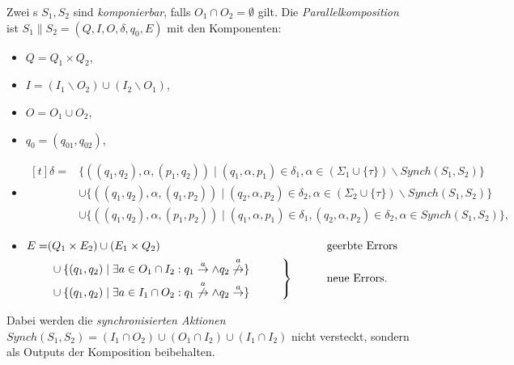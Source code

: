 \begin{Def}[Parallelkomposition]
  Zwei \EIO{}s $S_1, S_2$ sind \emph{komponierbar}, falls
  $O_1\cap O_2=\emptyset$ gilt. Die \emph{Parallelkomposition} ist
  $S_1\|S_2=(Q,I,O,\delta ,q_0,E)$ mit den Komponenten:
  \begin{itemize}
    \item $Q=Q_1\times Q_2$,
    \item $I=(I_1\backslash O_2)\cup(I_2\backslash O_1)$,
    \item $O=O_1\cup O_2$,
    \item $q_0=(q_{01},q_{02})$,
    \item $\begin{aligned}[t]
    \delta =&\{((q_1,q_2),\alpha ,(p_1,q_2))\mid (q_1,\alpha ,p_1)\in\delta
      _1,\alpha\in(\Sigma _1\cup\{\tau\})\backslash Synch(S_1,S_2)\}\\
      &\cup\{((q_1,q_2),\alpha ,(q_1,p_2))\mid (q_2,\alpha ,p_2)\in\delta
      _2,\alpha\in(\Sigma _2\cup\{\tau\})\backslash Synch(S_1,S_2)\}\\
      &\cup\{((q_1,q_2),\alpha ,(p_1,p_2))\mid (q_1,\alpha ,p_1)\in\delta
      _1, (q_2,\alpha ,p_2)\in\delta _2, \alpha\in Synch(S_1,S_2)\},
  \end{aligned}$
    \item $\begin{aligned}[t]
        E=&(Q_1\times E_2)\cup (E_1\times Q_2)
        &&\phantom{neue}\mathrm{geerbte}~\mathrm{Errors}\\
        &\left.\begin{aligned}
        &\cup\{(q_1,q_2)\mid \exists a\in O_1\cap I_2: q_1\overset{a}{\rightarrow}\wedge
      q_2\overset{a}{\not{\hspace{-0.1cm}\rightarrow}}\}\\
      &\cup\{(q_1,q_2)\mid \exists a\in I_1\cap O_2:
q_1\overset{a}{\not{\hspace{-0.1cm}\rightarrow}}\wedge
q_2\overset{a}{\rightarrow}\}
\end{aligned}\hspace{1cm}\right\}
      &&\phantom{neue}\mathrm{neue}~\mathrm{Errors}.\\
  \end{aligned}$
  \end{itemize}
  Dabei werden die \emph{synchronisierten Aktionen} $Synch(S_1,
  S_2)=(I_1\cap O_2)\cup(O_1\cap I_2)\cup (I_1\cap I_2)$ nicht versteckt, sondern als Outputs der
  Komposition beibehalten.
\end{Def}

